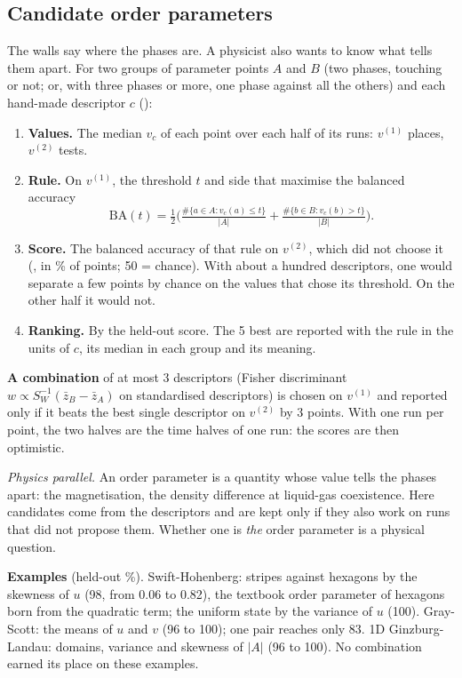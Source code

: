 \documentclass[11pt,a4paper]{article}
\newcommand{\repo}{https://github.com/Lu-Dumoulin/PhaseWall}
\newcommand{\srcref}[1]{\href{\repo/blob/main/#1}{\texttt{\detokenize{#1}}}}
\newcommand{\code}[1]{\texttt{\detokenize{#1}}}
\begin{document}
\subsection{Candidate order parameters}\label{sec:orderparams}

\begin{tech}
The walls say where the phases are. A physicist also wants to know what tells them apart. For two groups of
parameter points $A$ and $B$ (two phases, touching or not; or, with three phases or more, one phase against
all the others) and each hand-made descriptor $c$ (\srcref{src/phasewall/orderparams.py}):
\begin{enumerate}[leftmargin=1.4em]
\item \textbf{Values.} The median $v_c$ of each point over each half of its runs: $v^{(1)}$ places, $v^{(2)}$ tests.
\item \textbf{Rule.} On $v^{(1)}$, the threshold $t$ and side that maximise the balanced accuracy
  \[
  \mathrm{BA}(t)=\tfrac12\Big(\tfrac{\#\{a\in A: v_c(a)\le t\}}{|A|}+\tfrac{\#\{b\in B: v_c(b)>t\}}{|B|}\Big).
  \]
\item \textbf{Score.} The balanced accuracy of that rule on $v^{(2)}$, which did not choose it (\code{held_out},
  in \% of points; 50 = chance). With about a hundred descriptors, one would separate a few points by chance on the
  values that chose its threshold. On the other half it would not.
\item \textbf{Ranking.} By the held-out score. The 5 best are reported with the rule in the units of $c$, its
  median in each group and its meaning.
\end{enumerate}
\textbf{A combination} of at most 3 descriptors (Fisher discriminant $w\propto S_W^{-1}(\bar z_B-\bar z_A)$ on
standardised descriptors) is chosen on $v^{(1)}$ and reported only if it beats the best single descriptor on
$v^{(2)}$ by 3 points. With one run per point, the two halves are the time halves of one run: the scores are then
optimistic.

\emph{Physics parallel.} An order parameter is a quantity whose value tells the phases apart: the magnetisation,
the density difference at liquid-gas coexistence. Here candidates come from the descriptors and are kept only if
they also work on runs that did not propose them. Whether one is \emph{the} order parameter is a physical question.

\textbf{Examples} (held-out \%). Swift-Hohenberg: stripes against hexagons by the skewness of $u$ (98, from 0.06 to
0.82), the textbook order parameter of hexagons born from the quadratic term; the uniform state by the variance of
$u$ (100). Gray-Scott: the means of $u$ and $v$ (96 to 100); one pair reaches only 83. 1D Ginzburg-Landau: domains,
variance and skewness of $|A|$ (96 to 100). No combination earned its place on these examples.
\end{tech}
\end{document}
